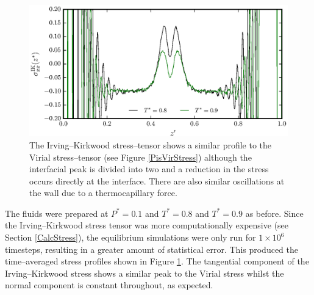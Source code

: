 \begin{figure}[h]
\centering
\includegraphics[scale=0.8]{PisIKStress}
\caption{The Irving--Kirkwood stress--tensor shows a similar profile to the Virial stress--tensor (see Figure \ref{PisVirStress}) although the interfacial peak is divided into two and a reduction in the stress occurs directly at the interface.
There are also similar oscillations at the wall due to a thermocapillary force.}
\label{PisIKStress}
\end{figure}
\FloatBarrier
The fluids were prepared at $P^{*}=0.1$ and $T^{*}=0.8$ and $T^{*}=0.9$ as before.
Since the Irving--Kirkwood stress tensor was more computationally expensive (see Section \ref{CalcStress}), the equilibrium simulations were only run for $1 \times 10^{6}$ timesteps, resulting in a greater amount of statistical error.
This produced the time--averaged stress profiles shown in Figure \ref{PisIKStress}.
The tangential component of the Irving--Kirkwood stress shows a similar peak to the Virial stress whilst the normal component is constant throughout, as expected.
\FloatBarrier

